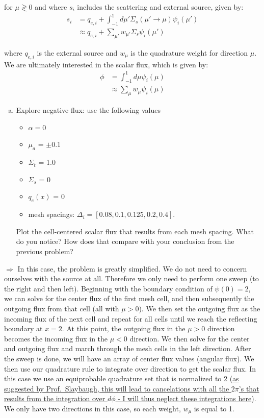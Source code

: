 \documentclass[10pt]{article}
\begin{document}
for $\mu\gtrless0$ and where $s_i$ includes the scattering and external source, given by:
%
\begin{align*}
    s_i &= q_{e,i} + \int_{-1}^1 d\mu' \Sigma_s(\mu'\rightarrow \mu) \psi_i(\mu') \\
    &\approx q_{e,i} + \sum_{\mu '} w_{\mu '} \Sigma_s \psi_i(\mu ')
\end{align*}

where $q_{e,i}$ is the external source and $w_\mu$ is the quadrature weight for direction $\mu$. We are ultimately interested in the scalar flux, which is given by:
%
\begin{align*}
    \phi &= \int_{-1}^1 d\mu \psi_i(\mu) \\
    &\approx \sum_\mu w_\mu \psi_i(\mu)
\end{align*}

%
%
%

\begin{enumerate}[(a)]
\item Explore negative flux: use the following values
\begin{itemize}
\setlength\itemsep{0em}
\item $\alpha = 0$
\item $\mu_a$ = $\pm$0.1
\item $\Sigma_t$ = 1.0
\item $\Sigma_s$ = 0
\item $q_e(x)$ = 0
\item mesh spacings: $\Delta_i = [0.08, 0.1, 0.125, 0.2, 0.4]$.
\end{itemize}
Plot the cell-centered scalar flux that results from each mesh spacing. What do you notice? How does that compare with your conclusion from the previous problem?
\end{enumerate}

$\Rightarrow$ In this case, the problem is greatly simplified. We do not need to concern ourselves with the source at all. Therefore we only need to perform one sweep (to the right and then left). Beginning with the boundary condition of $\psi(0) = 2$, we can solve for the center flux of the first mesh cell, and then subsequently the outgoing flux from that cell (all with $\mu >0$). We then set the outgoing flux as the incoming flux of the next cell and repeat for all cells until we reach the reflecting boundary at $x=2$. At this point, the outgoing flux in the $\mu>0$ direction becomes the incoming flux in the $\mu<0$ direction. We then solve for the center and outgoing flux and march through the mesh cells in the left direction. After the sweep is done, we will have an array of center flux values (angular flux). We then use our quadrature rule to integrate over direction to get the scalar flux. In this case we use an equiprobable quadrature set that is normalized to 2 (\ul{as suggested by Prof.~Slaybaugh, this will lead to cancelations with all the $2\pi$'s that results from the integration over $d\phi$ - I will thus neglect these integrations here}). We only have two directions in this case, so each weight, $w_\mu$ is equal to 1.\\
\end{document}
